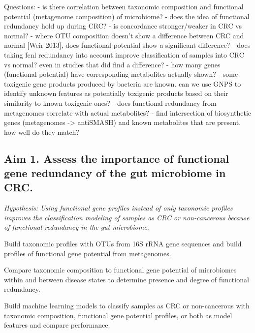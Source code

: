 \documentclass[12pt]{article}
\begin{document}
Questions:
- is there correlation between taxonomic composition and functional potential (metagenome composition) of microbiome?
- does the idea of functional redundancy hold up during CRC?
- is concordance stronger/weaker in CRC vs normal?
- where OTU composition doesn't show a difference between CRC and normal [Weir 2013], does functional potential show a significant difference?
- does taking fcnl redundancy into account improve classification of samples into CRC vs normal? even in studies that did find a difference?
- how many genes (functional potential) have corresponding metabolites actually shown?
- some toxigenic gene products produced by bacteria are known. can we use GNPS to identify unknown features as potentially toxigenic products based on their similarity to known toxigenic ones?
- does functional redundancy from metagenomes correlate with actual metabolites?
- find intersection of biosynthetic genes (metagenomes -> antiSMASH) and known metabolites that are present. how well do they match?

\subsection*{Aim 1. Assess the importance of functional gene redundancy of the gut microbiome in CRC.}
\textit{Hypothesis: Using functional gene profiles instead of only taxonomic profiles improves the classification modeling of samples as CRC or non-cancerous because of functional redundancy in the gut microbiome.}
\begin{compactenum}[A.]
    \item Build taxonomic profiles with OTUs from 16S rRNA gene sequences and build profiles of functional gene potential from metagenomes.
    \item Compare taxonomic composition to functional gene potential of microbiomes within and between disease states to determine presence and degree of functional redundancy.
    \item Build machine learning models to classify samples as CRC or non-cancerous with taxonomic composition, functional gene potential profiles, or both as model features and compare performance.
\end{compactenum}
\end{document}
